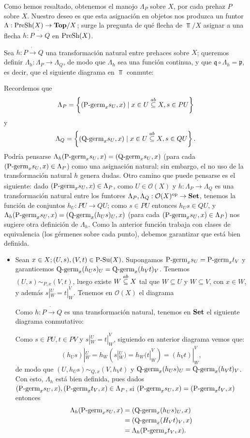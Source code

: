 Como hemos resaltado, obtenemos el manojo $\Lambda_P$ sobre $X$, por cada prehaz $P$ sobre $X$. Nuestro deseo es que esta asignación en objetos nos produzca un funtor $\Lambda:\normalfont{\text{PreSh}}(X)\to\normalfont{\textbf{Top}}/X$; surge la pregunta de qué flecha de $\Top/X$ asignar a una flecha $h:P\dot{\to} Q$ en $\normalfont{\text{PreSh}}(X)$.

Sea $h:P\dot{\to}Q$ una transformación natural entre prehaces sobre $X$; queremos definir $\Lambda_h:\Lambda_{P}\to\Lambda_{Q}$, de modo que $\Lambda_h$ sea una función continua, y que $\mathfrak{q}\circ\Lambda_h=\mathfrak{p}$, es decir, que el siguiente diagrama en $\Top$ conmute:

Recordemos que 
$$
   \Lambda_P=\left\lbrace (\normalfont{\text{P-germ}}_{x}s_{U},x)\mid x\in U\stackrel{ab}{\subseteq} X, s\in PU\right\rbrace
$$
y
$$
   \Lambda_Q=\left\lbrace (\normalfont{\text{Q-germ}}_{x}s_{U},x)\mid x\in U\stackrel{ab}{\subseteq} X, s\in QU\right\rbrace.
$$
Podría pensarse $\Lambda_h(\normalfont{\text{P-germ}}_{x}s_{U},x)=(\normalfont{\text{Q-germ}}_{x}s_{U},x)$ (para cada $(\normalfont{\text{P-germ}}_{x}s_{U},x)\in\Lambda_P$) como una asignación natural; sin embargo, el no uso de la transformación natural $h$ genera dudas. Otro camino que puede pensarse es el siguiente: dado $(\normalfont{\text{P-germ}}_{x}s_{U},x)\in \Lambda_P$, como $U\in\mathcal{O}(X)$ y $h:\Lambda_P\dot{\to}\Lambda_Q$ es una transformación natural entre los funtores $\Lambda_P,\Lambda_Q:\mathcal{O}(X)^{\text{op}}\to\normalfont{\textbf{Set}}$, tenemos la función de conjuntos $h_{U}:PU\to QU$; como $s\in PU$ entonces $h_{U}s\in QU$, y $\Lambda_h(\normalfont{\text{P-germ}}_{x}s_{U},x)=(\normalfont{\text{Q-germ}}_{x}(h_{U}s)_{U},x)$ (para cada $(\normalfont{\text{P-germ}}_{x}s_{U},x)\in\Lambda_P$) nos sugiere otra definición de $\Lambda_h$. Como la anterior función trabaja con clases de equivalencia (los gérmenes sobre cada punto), debemos garantizar que está bien definida. 
\begin{itemize}
   \item Sean $x\in X; (U,s),(V,t)\in\normalfont{\text{P-Su}}(X)$. Supongamos $\normalfont{\text{P-germ}}_{x}s_{U}=\normalfont{\text{P-germ}}_{x}t_{V}$ y garanticemos $\normalfont{\text{Q-germ}}_{x}(h_{U}s)_{U}=\normalfont{\text{Q-germ}}_{x}(h_{V}t)_{V}$. Tenemos $(U,s)\sim_{P,x}(V,t)$, luego existe $W\stackrel{ab}{\subseteq} X$ tal que $W\subseteq U$ y $W\subseteq V$, con $x\in W$, y además $s|^{U}_{W}=t|^{V}_{W}$. Tenemos en $\mathcal{O}(X)$ el diagrama
      
      Como $h:P\dot{\to} Q$ es una transformación natural, tenemos en $\normalfont{\textbf{Set}}$ el siguiente diagrama conmutativo:
      
      Como $s\in PU, t\in PV$ y $s|^{U}_{W}=t|^{V}_{W}$, siguiendo en anterior diagrama vemos que:
      $$
         (h_{U}s)|^{U}_{W}=h_{W}(s|^{U}_{W})=h_{W}(t|^{V}_{W})=(h_{V}t)|^{V}_{W},
      $$
      de modo que $(U,h_{U}s)\sim_{Q,x}(V,h_{V}t)$ y $\normalfont{\text{Q-germ}}_{x}(h_{U}s)_{U}=\normalfont{\text{Q-germ}}_{x}(h_{V}t)_{V}$. Con esto, $\Lambda_h$ está bien definida, pues dados $(\normalfont{\text{P-germ}}_{x}s_{U},x),(\normalfont{\text{P-germ}}_{x}t_{V},x)\in\Lambda_P$, si $(\normalfont{\text{P-germ}}_{x}s_{U},x)=(\normalfont{\text{P-germ}}_{x}t_{V},x)$ entonces
      $$
      \begin{aligned}
         \Lambda_h(\normalfont{\text{P-germ}}_{x}s_{U},x)&=(\normalfont{\text{Q-germ}}_{x}(h_{U}s)_{U},x)\\
                                     &=(\normalfont{\text{Q-germ}}_{x}(H_{V}t)_{V},x)\\
                                     &=\Lambda_h(\normalfont{\text{P-germ}}_{x}t_{V},x).
      \end{aligned}
      $$
\end{itemize}
